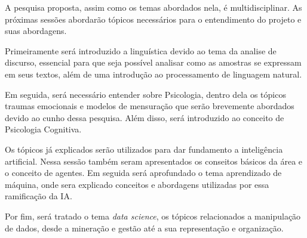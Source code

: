 A pesquisa proposta, assim como os temas abordados nela, é multidisciplinar. As próximas sessões abordarão tópicos necessários para o entendimento do projeto e suas abordagens.

Primeiramente será introduzido a linguística devido ao tema da analise de discurso, essencial para que seja possível analisar como as amostras se expressam em seus textos, além de uma introdução ao processamento de linguagem natural.

Em seguida, será necessário entender sobre Psicologia, dentro dela os tópicos traumas emocionais e modelos de mensuração que serão brevemente abordados devido ao cunho dessa pesquisa. Além disso, será introduzido ao conceito de Psicologia Cognitiva.

Os tópicos já explicados serão utilizados para dar fundamento a inteligência artificial. Nessa sessão também seram apresentados os conseitos básicos da área e o conceito de agentes. Em seguida será aprofundado o tema aprendizado de máquina, onde sera explicado conceitos e abordagens utilizadas por essa ramificação da IA.

Por fim, será tratado o tema \textit{data science}, os tópicos relacionados a manipulação de dados, desde a mineração e gestão até a sua representação e organização.






